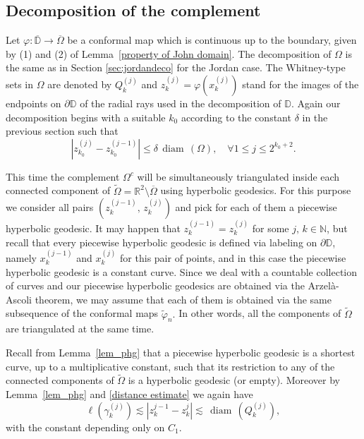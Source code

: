 \documentclass[reqno,11pt]{amsart}
\def\wz{\widetilde}
\def\ls{\lesssim}
\def\diam{{\mathop\mathrm{\,diam\,}}}
\numberwithin{equation}{section}
\theoremstyle{remark}
\begin{document}
\subsection{Decomposition of the complement}
Let  $\varphi\colon \overline{\mathbb D}\to \overline{\Omega}$ be a
conformal map which is continuous up to the boundary, given by (1) and (2) of   Lemma~\ref{property of John domain}. 
The decomposition of $\Omega$ is the same as in Section \ref{sec:jordandeco} 
for the Jordan case.
The Whitney-type sets in $\Omega$ are denoted by $Q_k^{(j)}$ and 
$z_k^{(j)} = \varphi(x_k^{(j)})$ stand for the images of the
endpoints on $\partial \mathbb D$ of the radial rays used in the decomposition of 
$\mathbb{D}$. Again our decomposition begins with a suitable $k_0$ according to the constant $\delta$ in the previous section such that
  $$|z_{k_0}^{(j)} -z_{k_0}^{(j-1)} |\le \delta \diam(\Omega), \quad \forall 1\le j\le 2^{k_0+2}.$$


This time the complement $\Omega^c$ will be simultaneously
triangulated inside each connected component
of $\wz \Omega=\mathbb R^2\setminus\overline{\Omega}$ using hyperbolic geodesics. For this purpose 
we consider all pairs $(z_k^{(j-1)} ,\, z_k^{(j)})$ and pick for each of
them a piecewise hyperbolic geodesic. 
It may happen that $z_k^{(j-1)}=z_k^{(j)}$ for some $j,\,k\in \mathbb N$, but recall that every piecewise hyperbolic geodesic is defined via labeling on $\partial \mathbb D$, namely $x_k^{(j-1)}$ and $x_k^{(j)}$ for this pair of points, and in this case the piecewise hyperbolic geodesic is a constant curve. 
Since we deal with a countable collection of curves
and our piecewise hyperbolic geodesics are obtained via the Arzel\`a-Ascoli 
theorem, we may assume that each of them is obtained via the same subsequence
of the conformal maps $\wz \varphi_n.$ 
In other words, all the components of $\wz \Omega$ are triangulated at the same time. 


Recall from Lemma~\ref{lem_phg}
that a piecewise hyperbolic geodesic is a shortest curve, up to a 
multiplicative constant, such that its
restriction to any of the connected components of $\wz \Omega$ is a 
hyperbolic geodesic (or empty).
Moreover by Lemma~\ref{lem_phg} and \eqref{distance estimate} we again have
\begin{equation}\label{length estimate}
 \ell(\gamma_k^{(j)})\ls |z_k^{j-1} - z_k^{j}| \lesssim \diam(Q_k^{(j)}),
\end{equation}
with the constant depending only on $C_1$. 

\end{document}
